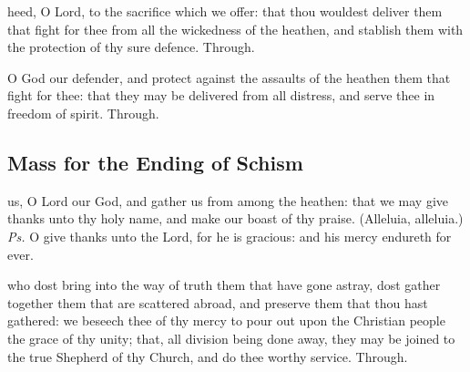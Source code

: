 \secret
{} heed, O Lord, to the sacrifice which we offer: that thou wouldest deliver them that fight for thee from all the wickedness of the heathen, and stablish them with the protection of thy sure defence. Through.


\postcommunion
{} O God our defender, and protect against the assaults of the heathen them that fight for thee: that they may be delivered from all distress, and serve thee in freedom of spirit. Through.


\subsection{Mass for the Ending of Schism}

\introit
{} us, O Lord our God, and gather us from among the heathen: that we may give thanks unto thy holy name, and make our boast of thy praise. (Alleluia, alleluia.) \textit{Ps.} O give thanks unto the Lord, for he is gracious: and his mercy endureth for ever.

\collect
{} who dost bring into the way of truth them that have gone astray, dost gather together them that are scattered abroad, and preserve them that thou hast gathered: we beseech thee of thy mercy to pour out upon the Christian people the grace of thy unity; that, all division being done away, they may be joined to the true Shepherd of thy Church, and do thee worthy service. Through.

